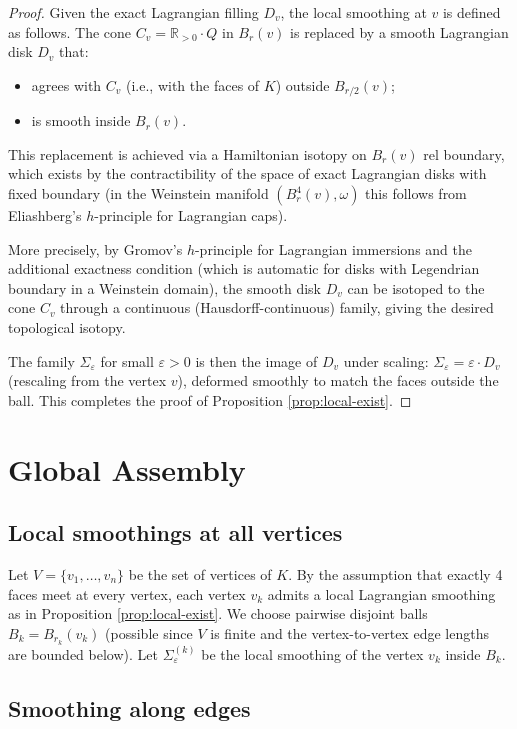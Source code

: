 \documentclass[12pt]{article}
\newcommand{\bR}{\mathbb{R}}
\newcommand{\eps}{\varepsilon}
\newcommand{\om}{\omega}
\begin{document}
\begin{proof}
Given the exact Lagrangian filling $D_v$, the local smoothing at $v$ is defined as follows. The cone $C_v = \bR_{>0} \cdot Q$ in $B_r(v)$ is replaced by a smooth Lagrangian disk $D_v$ that:
\begin{itemize}
  \item agrees with $C_v$ (i.e., with the faces of $K$) outside $B_{r/2}(v)$;
  \item is smooth inside $B_r(v)$.
\end{itemize}
This replacement is achieved via a Hamiltonian isotopy on $B_r(v)$ rel boundary, which exists by the contractibility of the space of exact Lagrangian disks with fixed boundary (in the Weinstein manifold $(B^4_r(v), \om)$ this follows from Eliashberg's $h$-principle for Lagrangian caps).

More precisely, by Gromov's $h$-principle for Lagrangian immersions and the additional exactness condition (which is automatic for disks with Legendrian boundary in a Weinstein domain), the smooth disk $D_v$ can be isotoped to the cone $C_v$ through a continuous (Hausdorff-continuous) family, giving the desired topological isotopy.

The family $\Sigma_\eps$ for small $\eps > 0$ is then the image of $D_v$ under scaling: $\Sigma_\eps = \eps \cdot D_v$ (rescaling from the vertex $v$), deformed smoothly to match the faces outside the ball. This completes the proof of Proposition \ref{prop:local-exist}.
\end{proof}

\section{Global Assembly}
\label{sec:global}

\subsection{Local smoothings at all vertices}

Let $V = \{v_1, \ldots, v_n\}$ be the set of vertices of $K$. By the assumption that exactly 4 faces meet at every vertex, each vertex $v_k$ admits a local Lagrangian smoothing as in Proposition \ref{prop:local-exist}. We choose pairwise disjoint balls $B_k = B_{r_k}(v_k)$ (possible since $V$ is finite and the vertex-to-vertex edge lengths are bounded below). Let $\Sigma_\eps^{(k)}$ be the local smoothing of the vertex $v_k$ inside $B_k$.

\subsection{Smoothing along edges}
\end{document}
